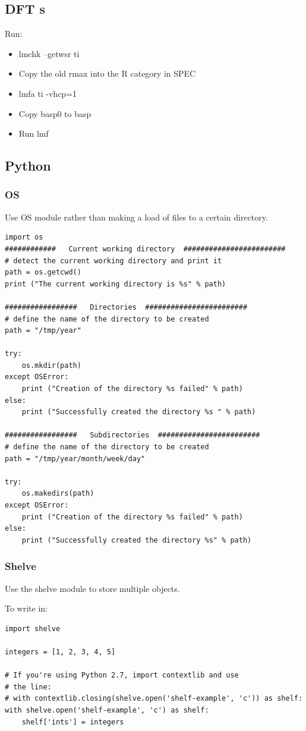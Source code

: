 \documentclass[11pt]{article}
\begin{document}
\subsection{DFT s}
\label{sec:orgc1ac739}
Run:
\begin{itemize}
\item lmchk --getwsr ti
\item Copy the old rmax into the R category in SPEC
\item lmfa ti -vhcp=1
\item Copy basp0 to basp
\item Run lmf
\end{itemize}
\subsection{Python}
\label{sec:org229fa1d}
\subsubsection{OS}
\label{sec:org6272254}
Use OS module rather than making a load of files to a certain directory. 
\begin{verbatim}
import os
############   Current working directory  ########################
# detect the current working directory and print it
path = os.getcwd()  
print ("The current working directory is %s" % path) 

#################   Directories  ########################
# define the name of the directory to be created
path = "/tmp/year"

try:  
    os.mkdir(path)
except OSError:  
    print ("Creation of the directory %s failed" % path)
else:  
    print ("Successfully created the directory %s " % path)

#################   Subdirectories  ########################
# define the name of the directory to be created
path = "/tmp/year/month/week/day"

try:  
    os.makedirs(path)
except OSError:  
    print ("Creation of the directory %s failed" % path)
else:  
    print ("Successfully created the directory %s" % path)
\end{verbatim}
\subsubsection{Shelve}
\label{sec:orgfda5a05}
Use the shelve module to store multiple objects. 

To write in:
\begin{verbatim}
import shelve

integers = [1, 2, 3, 4, 5]

# If you're using Python 2.7, import contextlib and use
# the line:
# with contextlib.closing(shelve.open('shelf-example', 'c')) as shelf:
with shelve.open('shelf-example', 'c') as shelf:
    shelf['ints'] = integers
\end{verbatim}
\end{document}
